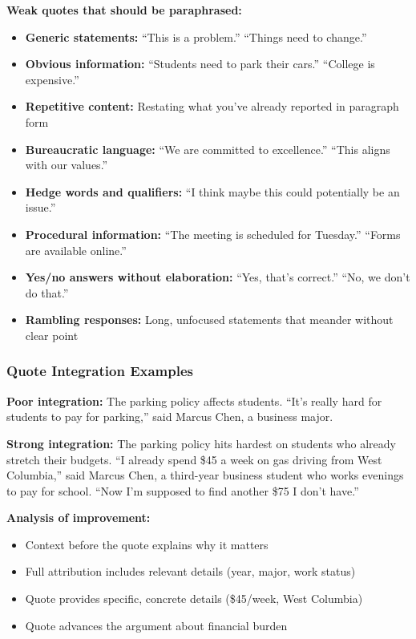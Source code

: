 \documentclass[12pt]{article}
\begin{document}
\begin{beforebox}
\textbf{Weak quotes that should be paraphrased:}
\begin{itemize}
    \item \textbf{Generic statements:} ``This is a problem.'' ``Things need to change.''
    \item \textbf{Obvious information:} ``Students need to park their cars.'' ``College is expensive.''
    \item \textbf{Repetitive content:} Restating what you've already reported in paragraph form
    \item \textbf{Bureaucratic language:} ``We are committed to excellence.'' ``This aligns with our values.''
    \item \textbf{Hedge words and qualifiers:} ``I think maybe this could potentially be an issue.''
    \item \textbf{Procedural information:} ``The meeting is scheduled for Tuesday.'' ``Forms are available online.''
    \item \textbf{Yes/no answers without elaboration:} ``Yes, that's correct.'' ``No, we don't do that.''
    \item \textbf{Rambling responses:} Long, unfocused statements that meander without clear point
\end{itemize}
\end{beforebox}



\newpage
\subsubsection{Quote Integration Examples}

\begin{beforebox}
\textbf{Poor integration:}
The parking policy affects students. ``It's really hard for students to pay for parking,'' said Marcus Chen, a business major.
\end{beforebox}

\begin{afterbox}
\textbf{Strong integration:}
The parking policy hits hardest on students who already stretch their budgets. ``I already spend \$45 a week on gas driving from West Columbia,'' said Marcus Chen, a third-year business student who works evenings to pay for school. ``Now I'm supposed to find another \$75 I don't have.''

\textbf{Analysis of improvement:}
\begin{itemize}
    \item Context before the quote explains why it matters
    \item Full attribution includes relevant details (year, major, work status)
    \item Quote provides specific, concrete details (\$45/week, West Columbia)
    \item Quote advances the argument about financial burden
\end{itemize}
\end{afterbox}
\end{document}

